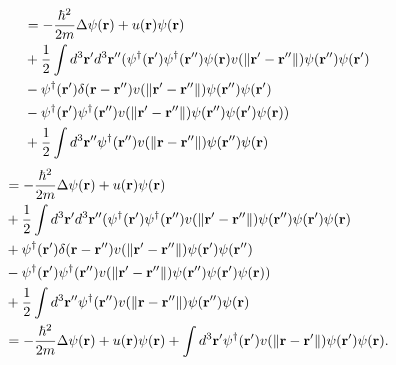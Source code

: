 \documentclass{article}
\begin{document}
\begin{align}
\begin{split}
&=-\frac{\hbar^2}{2m}\Delta\psi(\vb{r})+u(\vb{r})\psi(\vb{r})\\
&+\frac{1}{2}\int d^3\vb{r}'d^3\vb{r}''(\psi^\dagger(\vb{r}')\psi^\dagger(\vb{r}'')\psi(\vb{r})v(\|\vb{r}'-\vb{r}''\|)\psi(\vb{r}'')\psi(\vb{r}')\\
&-\psi^\dagger(\vb{r}')\delta(\vb{r}-\vb{r}'')v(\|\vb{r}'-\vb{r}''\|)\psi(\vb{r}'')\psi(\vb{r}')\\
&-\psi^\dagger(\vb{r}')\psi^\dagger(\vb{r}'')v(\|\vb{r}'-\vb{r}''\|)\psi(\vb{r}'')\psi(\vb{r}')\psi(\vb{r}))\\
&+\frac{1}{2}\int d^3\vb{r}''\psi^\dagger(\vb{r}'')v(\|\vb{r}-\vb{r}''\|)\psi(\vb{r}'')\psi(\vb{r})
\end{split}
\end{align}
\begin{align*}
&=-\frac{\hbar^2}{2m}\Delta\psi(\vb{r})+u(\vb{r})\psi(\vb{r})\\
&+\frac{1}{2}\int d^3\vb{r}'d^3\vb{r}''(\psi^\dagger(\vb{r}')\psi^\dagger(\vb{r}'')v(\|\vb{r}'-\vb{r}''\|)\psi(\vb{r}'')\psi(\vb{r}')\psi(\vb{r})\\
&+\psi^\dagger(\vb{r}')\delta(\vb{r}-\vb{r}'')v(\|\vb{r}'-\vb{r}''\|)\psi(\vb{r}')\psi(\vb{r}'')\\
&-\psi^\dagger(\vb{r}')\psi^\dagger(\vb{r}'')v(\|\vb{r}'-\vb{r}''\|)\psi(\vb{r}'')\psi(\vb{r}')\psi(\vb{r}))\\
&+\frac{1}{2}\int d^3\vb{r}''\psi^\dagger(\vb{r}'')v(\|\vb{r}-\vb{r}''\|)\psi(\vb{r}'')\psi(\vb{r})\\
&=-\frac{\hbar^2}{2m}\Delta\psi(\vb{r})+u(\vb{r})\psi(\vb{r})+\int d^3\vb{r}'\psi^\dagger(\vb{r}')v(\|\vb{r}-\vb{r}'\|)\psi(\vb{r}')\psi(\vb{r}).
\end{align*}
\end{document}
